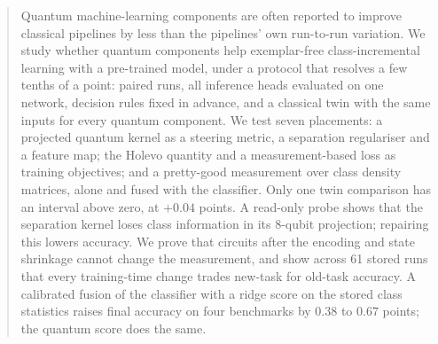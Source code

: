 \begin{abstract}
Quantum machine-learning components are often reported to improve classical
pipelines by less than the pipelines' own run-to-run variation. We study
whether quantum components help exemplar-free class-incremental learning with
a pre-trained model, under a protocol that resolves a few tenths of a point:
paired runs, all inference heads evaluated on one network, decision rules
fixed in advance, and a classical twin with the same inputs for every quantum
component. We test seven
placements: a projected quantum kernel as a steering metric, a separation
regulariser and a feature map; the Holevo quantity and a measurement-based
loss as training objectives; and a pretty-good measurement over class density
matrices, alone and fused with the classifier. Only one twin comparison has an
interval above zero, at $+0.04$ points. A read-only probe shows that the separation
kernel loses class information in its 8-qubit projection; repairing this lowers
accuracy. We prove that circuits after the encoding and state shrinkage
cannot change the measurement, and show across 61 stored runs that every
training-time change trades new-task for old-task accuracy. A calibrated fusion
of the classifier with a ridge score on the stored class statistics raises final
accuracy on four benchmarks by $0.38$ to $0.67$ points; the quantum score does
the same.
\end{abstract}
